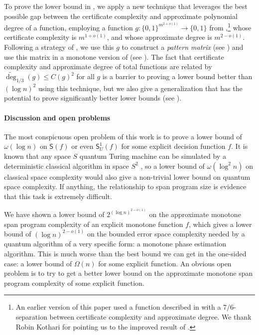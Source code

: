 \documentclass[11pt]{article}
\numberwithin{equation}{section}
\theoremstyle{definition}
\theoremstyle{plain}
\begin{document}
To prove the lower bound in , we apply a new technique that leverages the best possible gap between the certificate complexity and approximate polynomial degree of a function, employing a function $g:\{0,1\}^{m^{2+o(1)}}\rightarrow\{0,1\}$ from \cite{BT17},\footnote{An earlier version of this %
paper  %
used a function described in \cite{ABK16} with a $7/6$-separation between certificate complexity and approximate degree. We thank Robin Kothari for pointing us to the improved result of \cite{BT17}.} whose certificate complexity is $m^{1+o(1)}$, and whose approximate degree is $m^{2-o(1)}$. Following a strategy of \cite{RPRC16}, we use this $g$ to construct a \emph{pattern matrix} \cite{She09} (see ) and use this matrix in a monotone version of  (see ).
The fact that certificate complexity and approximate degree of total functions are related by $\widetilde{\deg}_{1/3}(g)\leq C(g)^2$ for all $g$ is a barrier to proving a lower bound better than $(\log n)^2$ using this technique, but we also give a generalization that has the potential to prove significantly better lower bounds (see ). 



\paragraph{Discussion and open problems} 
The most conspicuous open problem of this work is to prove a lower bound of $\omega(\log n)$ on $\mathsf{S}(f)$ or even $\mathsf{S}_U^1(f)$ for some explicit decision function $f$. 
It is known that any space $S$ quantum Turing machine can be simulated by a deterministic classical algorithm in space $S^2$ \cite{Wat99}, so a lower bound of $\omega(\log^2n)$ on classical space complexity would also give a non-trivial lower bound on quantum space complexity. If anything, the relationship to span program size is evidence that this task is extremely difficult. 

We have shown a lower bound of $2^{(\log n)^{2-o(1)}}$ on the approximate monotone span program complexity of an explicit monotone function $f$, which gives a lower bound of $(\log n)^{2-o(1)}$ on the bounded error space complexity needed by a quantum algorithm of a very specific form: a monotone phase estimation algorithm. 
This is much worse than the best bound we can get in the one-sided case: a lower bound of $\Omega(n)$ for some explicit function. An obvious open problem is to try to get a better lower bound on the approximate monotone span program complexity of some explicit function.
\end{document}
